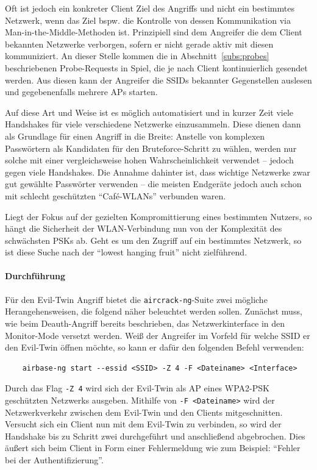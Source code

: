 Oft ist jedoch ein konkreter Client Ziel des Angriffs und nicht ein bestimmtes Netzwerk, wenn das Ziel bspw. die Kontrolle von dessen Kommunikation via Man-in-the-Middle-Methoden ist. Prinzipiell sind dem Angreifer die dem Client bekannten Netzwerke verborgen, sofern er nicht gerade aktiv mit diesen kommuniziert.
An dieser Stelle kommen die in Abschnitt~\ref{subs:probes} beschriebenen Probe-Requests in Spiel, die je nach Client kontinuierlich gesendet werden.
Aus diesen kann der Angreifer die SSIDs bekannter Gegenstellen auslesen und gegebenenfalls mehrere APs starten.

Auf diese Art und Weise ist es möglich automatisiert und in kurzer Zeit viele Handshakes für viele verschiedene Netzwerke einzusammeln. Diese dienen dann als Grundlage für einen Angriff in die Breite: Anstelle von komplexen Passwörtern als Kandidaten  für den Bruteforce-Schritt zu wählen, werden nur solche mit einer vergleichsweise hohen Wahrscheinlichkeit verwendet -- jedoch gegen viele Handshakes. Die Annahme dahinter ist, dass wichtige Netzwerke zwar gut gewählte Passwörter verwenden -- die meisten Endgeräte jedoch auch schon mit schlecht geschützten \enquote{Café-WLANs} verbunden waren.

Liegt der Fokus auf der gezielten Kompromittierung eines bestimmten Nutzers, so hängt die Sicherheit der WLAN-Verbindung nun von der Komplexität des schwächsten PSKs ab. Geht es um den Zugriff auf ein bestimmtes Netzwerk, so ist diese Suche nach der \enquote{lowest hanging fruit} nicht zielführend.

\paragraph{Durchführung}
Für den Evil-Twin Angriff bietet die \texttt{aircrack-ng}-Suite zwei mögliche Herangehensweisen, die folgend näher beleuchtet werden sollen.
Zunächst muss, wie beim Deauth-Angriff bereits beschrieben, das Netzwerkinterface in den Monitor-Mode versetzt werden.
Weiß der Angreifer im Vorfeld für welche SSID er den Evil-Twin öffnen möchte, so kann er dafür den folgenden Befehl verwenden:
\begin{Verbatim}
	airbase-ng start --essid <SSID> -Z 4 -F <Dateiname> <Interface>
\end{Verbatim}

Durch das Flag \texttt{-Z 4} wird sich der Evil-Twin als AP eines WPA2-PSK geschützten Netzwerks ausgeben.
Mithilfe von \texttt{-F <Dateiname>} wird der Netzwerkverkehr zwischen dem Evil-Twin und den Clients mitgeschnitten.
Versucht sich ein Client nun mit dem Evil-Twin zu verbinden, so wird der Handshake bis zu Schritt zwei durchgeführt und anschließend abgebrochen.
Dies äußert sich beim Client in Form einer Fehlermeldung wie zum Beispiel: \enquote{Fehler bei der Authentifizierung}. \\

